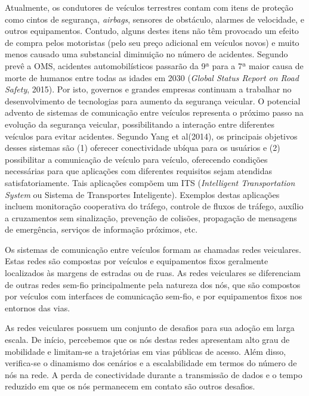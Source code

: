 \documentclass[
12pt,				%
openright,			%
oneside,			%
a4paper,			%
brazil,				%
]{abntex2}
\begin{document}
	\par Atualmente, os condutores de veículos terrestres contam com itens de proteção como cintos de segurança, \textit{airbags}, sensores de obstáculo, alarmes de velocidade, e outros equipamentos. Contudo, alguns destes itens não têm provocado um efeito de compra pelos motoristas (pelo seu preço adicional em veículos novos) e muito menos causado uma substancial diminuição no número de acidentes. Segundo prevê a OMS, acidentes automobilísticos passarão da 9ª para a 7ª maior causa de morte de humanos entre todas as idades em 2030 (\textit{Global Status Report on Road Safety}, 2015). Por isto, governos e grandes empresas continuam a trabalhar no desenvolvimento de tecnologias para aumento da segurança veicular. O potencial advento de sistemas de comunicação entre veículos representa o próximo passo na evolução da segurança veicular, possibilitando a interação entre diferentes veículos para evitar acidentes. Segundo Yang et al(2014), os principais objetivos desses sistemas são (1) oferecer conectividade ubíqua para os usuários e (2) possibilitar a comunicação de veículo para veículo, oferecendo condições necessárias para que aplicações com diferentes requisitos sejam atendidas satisfatoriamente. Tais aplicações compõem um ITS (\textit{Intelligent Transportation System} ou Sistema de Transportes Inteligente). Exemplos destas aplicações incluem monitoração cooperativa do tráfego, controle de fluxos de tráfego, auxílio a cruzamentos sem sinalização, prevenção de colisões, propagação de mensagens de emergência, serviços de informação próximos, etc.
	
	\par Os sistemas de comunicação entre veículos formam as chamadas redes veiculares. Estas redes são compostas por veículos e equipamentos fixos geralmente localizados às margens de estradas ou de ruas. As redes veiculares se diferenciam de outras redes sem-fio principalmente pela natureza dos nós, que são compostos por veículos com interfaces de comunicação sem-fio, e por equipamentos fixos nos entornos das vias. 
	
	\par As redes veiculares possuem um conjunto de desafios para sua adoção em larga escala. De início, percebemos que os nós destas redes apresentam alto grau de mobilidade e limitam-se a trajetórias em vias públicas de acesso. Além disso, verifica-se o dinamismo dos cenários e a escalabilidade em termos do número de nós na rede. A perda de conectividade durante a transmissão de dados e o tempo reduzido em que os nós permanecem em contato são outros desafios. 
	
\end{document}
